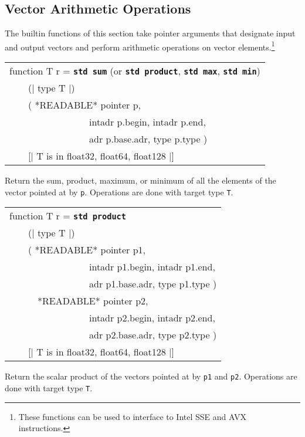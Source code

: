 \documentclass[12pt]{article}
\makeatletter
\newcommand{\TT}[1]{{\tt \bfseries #1}}
\newcommand{\ttstdmkey}[2]{\TT{std #1}\index{#1@{\tt std #1}!#2}}
\newenvironment{indpar}[1][0.3in]%
	{\begin{list}{}%
		     {\setlength{\itemsep}{0in}%
		      \setlength{\topsep}{0in}%
		      \setlength{\parsep}{1ex}%
		      \setlength{\labelwidth}{#1}%
		      \setlength{\leftmargin}{#1}%
		      \addtolength{\leftmargin}{\labelsep}}%
	 \item}%
	{\end{list}}
\makeatother
\begin{document}
\subsection{Vector Arithmetic Operations}
\label{VECTOR-ARITHMETIC-OPERATIONS}

The builtin functions of this section take pointer arguments that designate
input and output vectors and perform arithmetic operations on vector
elements.\footnote{These functions can be used to interface to
Intel SSE and AVX instructions.}

\begin{indpar}

{\tt\begin{tabular}{@{}l}
function T r = \ttstdmkey{sum}{of vector} (or \ttstdmkey{product}{of vector},
                                              \ttstdmkey{max}{of vector},
                                              \ttstdmkey{min}{of vector}) \\
~~~~(| type T |) \\
~~~~( *READABLE* pointer p, \\
~~~~~~~~~~~~~~~~~intadr p.begin, intadr p.end, \\
~~~~~~~~~~~~~~~~~adr p.base.adr, type p.type ) \\
~~~~[| T is in { float32, float64, float128 } |] \\
\end{tabular}}

\begin{indpar}
Return the sum, product, maximum, or minimum of all the elements of the vector
pointed at by {\tt p}.  Operations are done with target type {\tt T}.
\end{indpar}

{\tt\begin{tabular}{@{}l}
function T r = \ttstdmkey{product}{of vectors} \\
~~~~(| type T |) \\
~~~~( *READABLE* pointer p1, \\
~~~~~~~~~~~~~~~~~intadr p1.begin, intadr p1.end, \\
~~~~~~~~~~~~~~~~~adr p1.base.adr, type p1.type ) \\
~~~~~~*READABLE* pointer p2, \\
~~~~~~~~~~~~~~~~~intadr p2.begin, intadr p2.end, \\
~~~~~~~~~~~~~~~~~adr p2.base.adr, type p2.type ) \\
~~~~[| T is in { float32, float64, float128 } |] \\
\end{tabular}}

\begin{indpar}
Return the scalar product of the vectors pointed at by {\tt p1} and
{\tt p2}.  Operations are done with target type {\tt T}.
\end{indpar}

\end{indpar}
\end{document}
